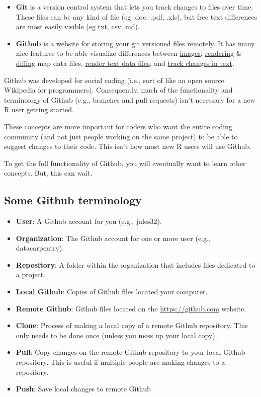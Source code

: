 \documentclass[]{book}
\providecommand{\tightlist}{%
  \setlength{\itemsep}{0pt}\setlength{\parskip}{0pt}}
\begin{document}
\begin{itemize}
\item
  \textbf{Git} is a version control system that lets you track changes to files over time. These files can be any kind of file (eg .doc, .pdf, .xls), but free text differences are most easily visible (eg txt, csv, md).
\item
  \textbf{Github} is a website for storing your git versioned files remotely. It has many nice features to be able visualize differences between \href{https://help.github.com/articles/rendering-and-diffing-images/}{images}, \href{https://help.github.com/articles/mapping-geojson-files-on-github/}{rendering} \& \href{https://github.com/blog/1772-diffable-more-customizable-maps}{diffing} map data files, \href{https://help.github.com/articles/rendering-csv-and-tsv-data/}{render text data files}, and \href{https://help.github.com/articles/rendering-differences-in-prose-documents/}{track changes in text}.
\end{itemize}

Github was developed for social coding (i.e., sort of like an open source Wikipedia for programmers). Consequently, much of the functionality and terminology of Github (e.g., branches and pull requests) isn't necessary for a new R user getting started.

These concepts are more important for coders who want the entire coding community (and not just people working on the same project) to be able to suggest changes to their code. This isn't how most new R users will use Github.

To get the full functionality of Github, you will eventually want to learn other concepts. But, this can wait.

\hypertarget{some-github-terminology}{%
\subsection{Some Github terminology}\label{some-github-terminology}}

\begin{itemize}
\tightlist
\item
  \textbf{User}: A Github account for you (e.g., jules32).
\item
  \textbf{Organization}: The Github account for one or more user (e.g., datacarpentry).
\item
  \textbf{Repository}: A folder within the organization that includes files dedicated to a project.
\item
  \textbf{Local Github}: Copies of Github files located your computer.
\item
  \textbf{Remote Github}: Github files located on the \url{https://github.com} website.
\item
  \textbf{Clone}: Process of making a local copy of a remote Github repository. This only needs to be done once (unless you mess up your local copy).
\item
  \textbf{Pull}: Copy changes on the remote Github repository to your local Github repository. This is useful if multiple people are making changes to a repository.
\item
  \textbf{Push}: Save local changes to remote Github
\end{itemize}
\end{document}
